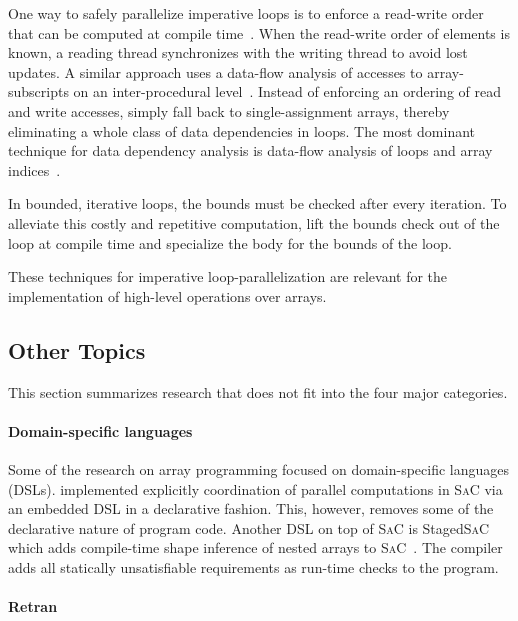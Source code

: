 \documentclass[a4paper]{article}
\newcommand{\sac}{S\textsc{a}C}
\begin{document}
One way to safely parallelize imperative loops is to enforce a
read-write order that can be computed at compile
time~\cite{Tang:1990:CTD:77726.255155}. When the read-write order of
elements is known, a reading thread synchronizes with the writing
thread to avoid lost updates. A similar approach uses a data-flow
analysis of accesses to array-subscripts on an inter-procedural
level~\cite{Maydan:1993:AFA:158511.158515}. Instead of enforcing an
ordering of read and write accesses,
\citet{Knobe:1998:ASF:268946.268956} simply fall back to
single-assignment arrays, thereby eliminating a whole class of data
dependencies in loops. The most dominant technique for data dependency
analysis is data-flow analysis of loops and array
indices~\cite{Maydan:1993:AFA:158511.158515,
  Knobe:1998:ASF:268946.268956}.

In bounded, iterative loops, the bounds must be checked after every
iteration. To alleviate this costly and repetitive computation,
\citet{Henriksen:2014:BCI:2627373.2627388} lift the bounds check out
of the loop at compile time and specialize the body for the bounds of
the loop.

These techniques for imperative loop-parallelization are relevant for
the implementation of high-level operations over arrays.

\subsection{Other Topics}
\label{sec:other-topics}

This section summarizes research that does not fit into the four major
categories.

\paragraph{Domain-specific languages}

Some of the research on array programming focused on domain-specific
languages (DSLs). \citet{4228136} implemented explicitly coordination
of parallel computations in \sac{} via an embedded DSL in a
declarative fashion. This, however, removes some of the declarative
nature of program code. Another DSL on top of \sac{} is Staged\sac{}
which adds compile-time shape inference of nested arrays to
\sac{}~\cite{Ureche:2012:SCS:2103746.2103762}. The compiler adds all
statically unsatisfiable requirements as run-time checks to the
program.

\paragraph{Retran}
\end{document}
